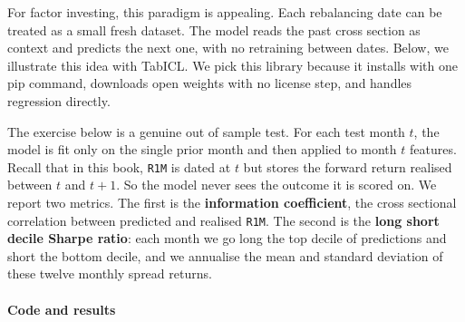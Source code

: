 For factor investing, this paradigm is appealing. Each rebalancing date can be treated as a small fresh dataset. The model reads the past cross section as context and predicts the next one, with no retraining between dates. Below, we illustrate this idea with TabICL. We pick this library because it installs with one pip command, downloads open weights with no license step, and handles regression directly.

The exercise below is a genuine out of sample test. For each test month $t$, the model is fit only on the single prior month and then applied to month $t$ features. Recall that in this book, \texttt{R1M} is dated at $t$ but stores the forward return realised between $t$ and $t+1$. So the model never sees the outcome it is scored on. We report two metrics. The first is the \textbf{information coefficient}, the cross sectional correlation between predicted and realised \texttt{R1M}. The second is the \textbf{long short decile Sharpe ratio}: each month we go long the top decile of predictions and short the bottom decile, and we annualise the mean and standard deviation of these twelve monthly spread returns.

\paragraph{Code and results}

